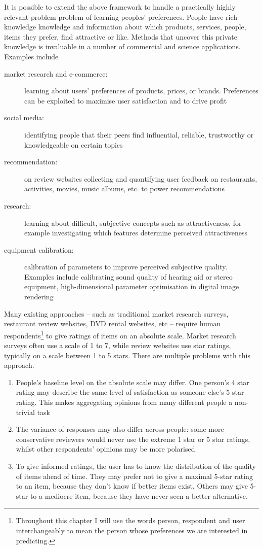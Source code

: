 It is possible to extend the above framework to handle a practically highly relevant problem problem of learning peoples' preferences. People have rich knowledge knowledge and information about which products, services, people, items they prefer, find attractive or like. Methods that uncover this private knowledge is invaluable in a number of commercial and science applications. Examples include
\begin{description}
	\item [market research and e-commerce:] learning about users' preferences of products, prices, or brands. Preferences can be exploited to maximise user satisfaction and to drive profit
	\item [social media:] identifying people that their peers find influential, reliable, trustworthy or knowledgeable on certain topics
	\item [recommendation:] on review websites collecting and quantifying user feedback on restaurants, activities, movies, music albums, etc. to power recommendations
	\item [research:] learning about difficult, subjective concepts such as attractiveness, for example investigating which features determine perceived attractiveness
	\item [equipment calibration:] calibration of parameters to improve perceived subjective quality. Examples include calibrating sound quality of hearing aid or stereo equipment, high-dimensional parameter optimisation in digital image rendering
\end{description}

Many existing approaches -- such as traditional market research surveys, restaurant review websites, DVD rental websites, etc -- require human respondents\footnote{Throughout this chapter I will use the words person, respondent and user interchangeably to mean the person whose preferences we are interested in predicting.} to give ratings of items on an absolute scale. Market research surveys often use a scale of 1 to 7, while review websites use star ratings, typically on a scale between 1 to 5 stars. There are multiple problems with this approach.
\begin{enumerate}
	\item People's baseline level on the absolute scale may differ. One person's 4 star rating may describe the same level of satisfaction as someone else's 5 star rating. This makes aggregating opinions from many different people a non-trivial task
	\item The variance of responses may also differ across people: some more conservative reviewers would never use the extreme 1 star or 5 star ratings, whilst other respondents' opinions may be more polarised
	\item To give informed ratings, the user has to know the distribution of the quality of items ahead of time. They may prefer not to give a maximal 5-star rating to an item, because they don't know if better items exist. Others may give 5-star to a mediocre item, because they have never seen a better alternative.
\end{enumerate} 

